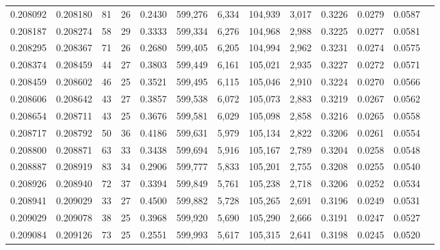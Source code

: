 \begin{tabular}{rrrrrrrrrrrrr}
0.208092 & 0.208180 &    81 &  26 &                                     0.2430 & 599,276 &   6,334 & 104,939 &   3,017 & 0.3226 & 0.0279 & 0.0587 \\
0.208187 & 0.208274 &    58 &  29 &                                     0.3333 & 599,334 &   6,276 & 104,968 &   2,988 & 0.3225 & 0.0277 & 0.0581 \\
0.208295 & 0.208367 &    71 &  26 &                                     0.2680 & 599,405 &   6,205 & 104,994 &   2,962 & 0.3231 & 0.0274 & 0.0575 \\
0.208374 & 0.208459 &    44 &  27 &                                     0.3803 & 599,449 &   6,161 & 105,021 &   2,935 & 0.3227 & 0.0272 & 0.0571 \\
0.208459 & 0.208602 &    46 &  25 &                                     0.3521 & 599,495 &   6,115 & 105,046 &   2,910 & 0.3224 & 0.0270 & 0.0566 \\
0.208606 & 0.208642 &    43 &  27 &                                     0.3857 & 599,538 &   6,072 & 105,073 &   2,883 & 0.3219 & 0.0267 & 0.0562 \\
0.208654 & 0.208711 &    43 &  25 &                                     0.3676 & 599,581 &   6,029 & 105,098 &   2,858 & 0.3216 & 0.0265 & 0.0558 \\
0.208717 & 0.208792 &    50 &  36 &                                     0.4186 & 599,631 &   5,979 & 105,134 &   2,822 & 0.3206 & 0.0261 & 0.0554 \\
0.208800 & 0.208871 &    63 &  33 &                                     0.3438 & 599,694 &   5,916 & 105,167 &   2,789 & 0.3204 & 0.0258 & 0.0548 \\
0.208887 & 0.208919 &    83 &  34 &                                     0.2906 & 599,777 &   5,833 & 105,201 &   2,755 & 0.3208 & 0.0255 & 0.0540 \\
0.208926 & 0.208940 &    72 &  37 &                                     0.3394 & 599,849 &   5,761 & 105,238 &   2,718 & 0.3206 & 0.0252 & 0.0534 \\
0.208941 & 0.209029 &    33 &  27 &                                     0.4500 & 599,882 &   5,728 & 105,265 &   2,691 & 0.3196 & 0.0249 & 0.0531 \\
0.209029 & 0.209078 &    38 &  25 &                                     0.3968 & 599,920 &   5,690 & 105,290 &   2,666 & 0.3191 & 0.0247 & 0.0527 \\
0.209084 & 0.209126 &    73 &  25 &                                     0.2551 & 599,993 &   5,617 & 105,315 &   2,641 & 0.3198 & 0.0245 & 0.0520 \\

\end{tabular}
